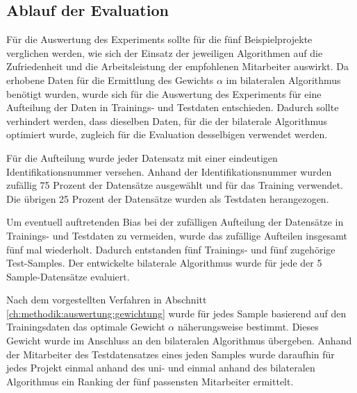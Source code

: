 


\subsection{Ablauf der Evaluation}
\label{ch:methodik:auswertung:ablauf}
Für die Auswertung des Experiments sollte für die fünf Beispielprojekte verglichen werden, wie sich der Einsatz der jeweiligen Algorithmen auf die Zufriedenheit und die Arbeitsleistung der empfohlenen Mitarbeiter auswirkt.
Da erhobene Daten für die Ermittlung des Gewichts $\alpha$ im bilateralen Algorithmus benötigt wurden, wurde sich für die Auswertung des Experiments für eine Aufteilung der Daten in Trainings- und Testdaten entschieden.
Dadurch sollte verhindert werden, dass dieselben Daten, für die der bilaterale Algorithmus optimiert wurde, zugleich für die Evaluation desselbigen verwendet werden.

Für die Aufteilung wurde jeder Datensatz mit einer eindeutigen Identifikationsnummer versehen.
Anhand der Identifikationsnummer wurden zufällig 75 Prozent der Datensätze ausgewählt und für das Training verwendet.
Die übrigen 25 Prozent der Datensätze wurden als Testdaten herangezogen.

Um eventuell auftretenden Bias bei der zufälligen Aufteilung der Datensätze in Trainings- und Testdaten zu vermeiden, wurde das zufällige Aufteilen insgesamt fünf mal wiederholt.
Dadurch entstanden fünf Trainings- und fünf zugehörige Test-Samples.
Der entwickelte bilaterale Algorithmus wurde für jede der 5 Sample-Datensätze evaluiert.

Nach dem vorgestellten Verfahren in Abschnitt \ref{ch:methodik:auswertung:gewichtung} wurde für jedes Sample basierend auf den Trainingsdaten das optimale Gewicht $\alpha$ näherungsweise bestimmt.
Dieses Gewicht wurde im Anschluss an den bilateralen Algorithmus übergeben.
Anhand der Mitarbeiter des Testdatensatzes eines jeden Samples wurde daraufhin für jedes Projekt einmal anhand des uni- und einmal anhand des bilateralen Algorithmus ein Ranking der fünf passensten Mitarbeiter ermittelt.

